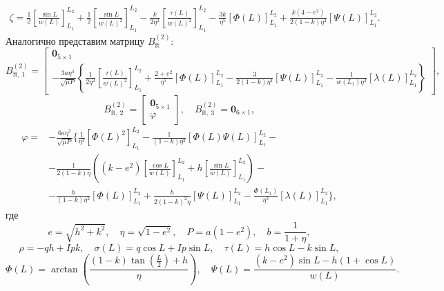 \begin{align*}
    \zeta = \frac{1}{2} \left[ \frac{\sin L}{w(L)} \right]_{L_1}^{L_2} +
    \frac{1}{2} \left[ \frac{\sin L}{w(L)^2} \right]_{L_1}^{L_2} -
    \frac{k}{2 \eta^2} \left[ \frac{\tau(L)}{w(L)^2} \right]_{L_1}^{L_2} -
    \frac{3k}{\eta^5} \left[ \Phi(L) \right]_{L_1}^{L_2} +
    \frac{k (4 - e^2)}{2 (1 - k) \eta^4} \left[ \Psi(L) \right]_{L_1}^{L_2}.
\end{align*}
Аналогично представим матрицу $B_{\text{ft}}^{(2)}$:
\begin{equation*}
B_{\text{ft, 1}}^{(2)} =
    \begin{bmatrix}
        \mathbf{0}_{5 \times 1} \\
        -\frac{3 a \eta^3}{\sqrt{\mu P}} \left\{ \frac{1}{2 \eta^2} \left[ \frac{\tau(L)}{w(L)^2} \right]_{L_1}^{L_2} +
        \frac{2 + e^2}{\eta^5} \left[ \Phi(L) \right]_{L_1}^{L_2} -
        \frac{3}{2 (1 - k) \eta^4} \left[ \Psi(L) \right]_{L_1}^{L_2} -
        \frac{1}{w(L_1) \eta^3} \left[ \lambda(L) \right]_{L_1}^{L_2} \right\}
    \end{bmatrix},
\end{equation*}
\begin{equation*}
B_{\text{ft, 2}}^{(2)} =
    \begin{bmatrix}
        \mathbf{0}_{5 \times 1} \\
        \varphi
    \end{bmatrix},
    \quad
    B_{\text{ft, 3}}^{(2)} = \mathbf{0}_{6 \times 1},
\end{equation*}
\begin{align*}
    \varphi = &-\frac{6 a \eta^2}{\sqrt{\mu P}} \biggl\{ \frac{1}{\eta^3} \left[ \Phi(L)^2 \right]_{L_1}^{L_2} -
    \frac{1}{(1 - k) \eta^2} \left[ \Phi(L) \Psi(L) \right]_{L_1}^{L_2} - \\
    &-\frac{1}{2 (1 - k) \eta} \left( (k - e^2) \left[ \frac{\cos L}{w(L)} \right]_{L_1}^{L_2} +
    h \left[ \frac{\sin L}{w(L)} \right]_{L_1}^{L_2} \right) - \\
    &-\frac{h}{(1 - k) \eta^2} \left[ \Phi(L) \right]_{L_1}^{L_2} +
    \frac{h}{2 (1 - k)^2 \eta} \left[ \Psi(L) \right]_{L_1}^{L_2} -
    \frac{\Phi(L_1)}{\eta^3} \left[ \lambda(L) \right]_{L_1}^{L_2} \biggr\},
\end{align*}
где
\begin{equation*}
    e = \sqrt{h^2 + k^2}, \quad
    \eta = \sqrt{1 - e^2}, \quad
    P = a (1 - e^2), \quad
    b = \frac{1}{1 + \eta},
\end{equation*}
\begin{equation*}
    \rho = -qh + Ipk, \quad
    \sigma(L) = q \cos L + I p \sin L, \quad
    \tau(L) = h \cos L - k \sin L,
\end{equation*}
\begin{equation*}
    \Phi(L) = \arctan \left( \frac{(1 - k) \tan \left(\frac{L}{2} \right) + h}{\eta} \right), \quad
    \Psi(L) = \frac{(k - e^2) \sin L - h (1 + \cos L)}{w(L)}.
\end{equation*}
